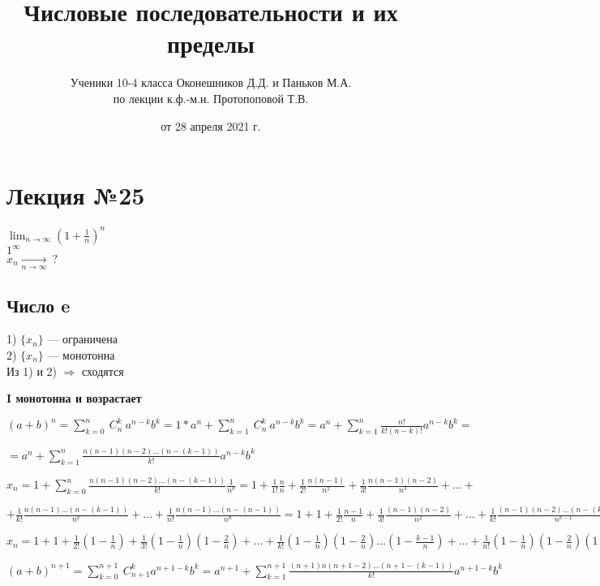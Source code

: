 \documentclass{article}
\begin{document}
\title{Числовые последовательности и их пределы}
\author{Ученики 10-4 класса Оконешников Д.Д. и Паньков М.А.\\ по лекции к.ф.-м.н. Протопоповой Т.В.}
\date{от 28 апреля 2021 г.}
\maketitle

\section{Лекция №25}

\(\lim_{n \rightarrow \infty}{(1 + \frac{1}{n})^n}\)
\\ \(1^{\infty}\)
\\ \( x_n \xrightarrow[n \rightarrow \infty ]{}\ ? \)

\subsection{Число e}
1) \( \{ x_n \} \) --- ограничена \\
2) \( \{ x_n \} \) --- монотонна \\
Из 1) и 2) \( \Rightarrow \) сходятся

\textbf{I монотонна и возрастает}

\((a+b)^n = \sum_{k=0}^n\ C^k_n \ a^{n-k}b^k=1*a^n+\sum_{k=1}^n\ C^k_n \ a^{n-k}b^k = a^n+\sum_{k=1}^n \frac{n!}{k!(n-k)!} a^{n-k}b^k = \)

\( = a^n + \sum_{k=1}^n \frac{n(n-1)(n-2)...(n-(k-1))}{k!} a^{n-k} b^k\)

\( x_n = 1 + \sum_{k=0}^n \frac{n(n-1)(n-2)...(n-(k-1))}{k!} \frac{1}{n^k} = 1 + \frac{1}{1!} \frac{n}{n} + \frac{1}{2!} \frac{n(n-1)}{n^2} + \frac{1}{3!} \frac{n(n-1)(n-2)}{n^3} + ... + \)

\( + \frac{1}{k!} \frac{n(n-1)...(n-(k-1))}{n^k} + ... + \frac{1}{n!} \frac{n(n-1)...(n-(n-1))}{n^n} = 1 + 1 + \frac{1}{2!} \frac{n-1}{n} + \frac{1}{3!} \frac{(n-1)(n-2)}{n^2} + ... + \frac{1}{k!} \frac{(n-1)(n-2)...(n-(k-1))}{n^{k-1}} + ... +\)

\(x_n = 1+1+\frac{1}{2!}(1-\frac{1}{n})+\frac{1}{3!}(1-\frac{1}{n})(1-\frac{2}{n})+...+\frac{1}{k!}(1-\frac{1}{n})(1-\frac{2}{n})...(1-\frac{k-1}{n}) + ... + \frac{1}{n!} (1 - \frac{1}{n})(1 - \frac{2}{n})(1 - \frac{n-1}{n})\)

\((a+b)^{n+1} = \sum_{k=0}^{n+1}\ C_{n+1}^k a^{n+1-k} b^k = a^{n+1} + \sum_{k=1}^{n+1} \frac{(n+1)n(n+1-2)...(n+1-(k-1))}{k!} a^{n+1-k} b^k\)
\end{document}
